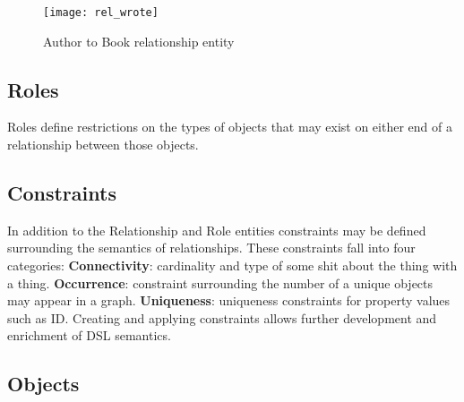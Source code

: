 \begin{figure}[h]
  \centering
  \texttt{[image: rel\_wrote]}
  \caption{Author to Book relationship entity}
  \label{fig:authrel}
\end{figure}


\subsection{Roles}
Roles define restrictions on the types of objects that may exist on either end of a relationship between those objects. 

\subsection{Constraints}
In addition to the Relationship and Role entities constraints may be defined surrounding the semantics of relationships. These constraints fall into four categories:\newline
\textbf{Connectivity}: cardinality and type of some shit about the thing with a thing. \newline
\textbf{Occurrence}: constraint surrounding the number of a unique objects may appear in a graph.\newline
\textbf{Uniqueness}: uniqueness constraints for property values such as ID.\newline
Creating and applying constraints allows further development and enrichment of DSL semantics.
\subsection{Objects}


